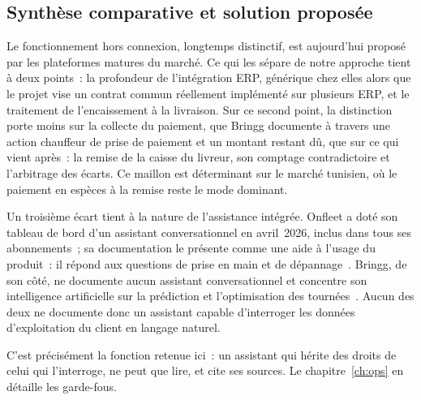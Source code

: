 \subsection{Synthèse comparative et solution proposée}

Le fonctionnement hors connexion, longtemps distinctif, est aujourd'hui proposé par les plateformes
matures du marché. Ce qui les sépare de notre approche tient à deux points~: la profondeur de
l'intégration ERP, générique chez elles alors que le projet vise un contrat commun réellement
implémenté sur plusieurs ERP, et le traitement de l'encaissement à la livraison. Sur ce second
point, la distinction porte moins sur la collecte du paiement, que Bringg documente à travers une
action chauffeur de prise de paiement et un montant restant dû, que sur ce qui vient après~: la remise de
la caisse du livreur, son comptage contradictoire et l'arbitrage des écarts. Ce maillon est
déterminant sur le marché tunisien, où le
paiement en espèces à la remise reste le mode dominant.

Un troisième écart tient à la nature de l'assistance intégrée. Onfleet a doté son tableau de bord
d'un assistant conversationnel en avril~2026, inclus dans tous ses abonnements~; sa documentation le
présente comme une aide à l'usage du produit~: il répond aux questions de prise en main et de
dépannage~\cite{onfleet-assistant}. Bringg, de son côté, ne documente aucun assistant
conversationnel et concentre son intelligence artificielle sur la prédiction et l'optimisation des
tournées~\cite{bringg-ptos}. Aucun des deux ne documente donc un assistant capable d'interroger les
données d'exploitation du client en langage naturel.

C'est précisément la fonction retenue ici~: un assistant qui hérite des droits de celui qui
l'interroge, ne peut que lire, et cite ses sources. Le chapitre~\ref{ch:ops} en détaille les
garde-fous.

